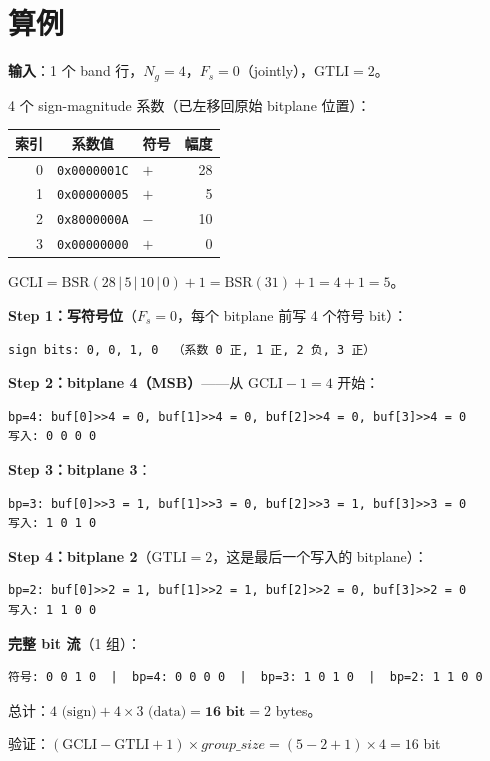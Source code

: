 \section{算例}

\begin{examplebox}[title={单组系数的 Data Packing}]

\textbf{输入}：1 个 band 行，$N_g = 4$，$F_s = 0$（jointly），$\mathrm{GTLI} = 2$。

4 个 sign-magnitude 系数（已左移回原始 bitplane 位置）：

\begin{table}[H]
\centering
\begin{tabular}{@{}rclr@{}}
\toprule
索引 & 系数值 & 符号 & 幅度 \\
\midrule
0 & \texttt{0x0000001C} & $+$ & 28 \\
1 & \texttt{0x00000005} & $+$ & 5 \\
2 & \texttt{0x8000000A} & $-$ & 10 \\
3 & \texttt{0x00000000} & $+$ & 0 \\
\bottomrule
\end{tabular}
\end{table}

$\mathrm{GCLI} = \mathrm{BSR}(28\,|\,5\,|\,10\,|\,0) + 1 = \mathrm{BSR}(31) + 1 = 4 + 1 = 5$。

\medskip
\textbf{Step 1：写符号位}（$F_s=0$，每个 bitplane 前写 4 个符号 bit）：
\begin{lstlisting}[numbers=none]
sign bits: 0, 0, 1, 0  （系数 0 正, 1 正, 2 负, 3 正）
\end{lstlisting}

\textbf{Step 2：bitplane 4（MSB）}——从 $\mathrm{GCLI}-1 = 4$ 开始：
\begin{lstlisting}[numbers=none]
bp=4: buf[0]>>4 = 0, buf[1]>>4 = 0, buf[2]>>4 = 0, buf[3]>>4 = 0
写入: 0 0 0 0
\end{lstlisting}

\textbf{Step 3：bitplane 3}：
\begin{lstlisting}[numbers=none]
bp=3: buf[0]>>3 = 1, buf[1]>>3 = 0, buf[2]>>3 = 1, buf[3]>>3 = 0
写入: 1 0 1 0
\end{lstlisting}

\textbf{Step 4：bitplane 2}（$\mathrm{GTLI} = 2$，这是最后一个写入的 bitplane）：
\begin{lstlisting}[numbers=none]
bp=2: buf[0]>>2 = 1, buf[1]>>2 = 1, buf[2]>>2 = 0, buf[3]>>2 = 0
写入: 1 1 0 0
\end{lstlisting}

\textbf{完整 bit 流}（1 组）：
\begin{lstlisting}[numbers=none]
符号: 0 0 1 0  |  bp=4: 0 0 0 0  |  bp=3: 1 0 1 0  |  bp=2: 1 1 0 0
\end{lstlisting}

总计：$4 \text{ (sign)} + 4 \times 3 \text{ (data)} = \mathbf{16 \text{ bit}} = 2$ bytes。

验证：$(\mathrm{GCLI} - \mathrm{GTLI} + 1) \times \mathit{group\_size} = (5 - 2 + 1) \times 4 = 16$ bit \checkmark
\end{examplebox}


